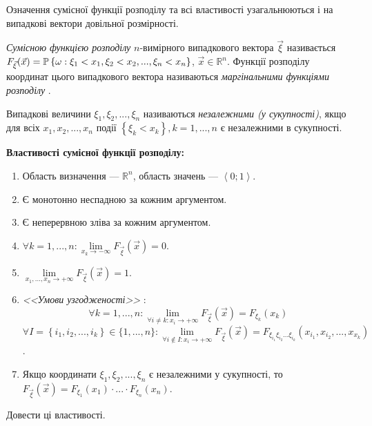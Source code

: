 Означення сумісної функції розподілу та всі властивості узагальнюються і на випадкові вектори довільної розмірності.
\begin{definition} 
    \emph{Сумісною функцією розподілу} $n$-вимірного випадкового вектора $\vec{\xi}$ 
    називається $F_{\vec{\xi}}(\vec{x}) = \P\left\{\omega: \xi_1 < x_1, \xi_2 < x_2, ..., \xi_n < x_n\right\}$, $\vec{x} \in \mathbb{R}^n$.
    Функції розподілу координат цього випадкового вектора називаються \emph{маргінальними функціями розподілу} .
\end{definition}
\begin{definition}
    Випадкові величини $\xi_1, \xi_2, ..., \xi_n$ називаються
    \emph{незалежними (у сукупності)}, якщо для всіх
    $x_1, x_2, ... , x_n$
    події $\left\{\xi_k < x_k\right\}, k=1,...,n$ є незалежними в сукупності.
\end{definition}

\noindent\textbf{Властивості сумісної функції розподілу:}
\begin{enumerate}
    \item Область визначення --- $\mathbb{R}^n$, область значень --- $\left<0; 1\right>$.
    \item Є монотонно неспадною за кожним аргументом.
    \item Є неперервною зліва за кожним аргументом.
    \item $\forall k = 1,...,n: \underset{x_k \to -\infty}{\lim} F_{\vec{\xi}}(\vec{x}) = 0$.
    \item $\lim\limits_{x_1, ..., x_n \rightarrow +\infty} F_{\vec{\xi}}(\vec{x}) = 1$.
    \item \emph{<<Умови узгодженості>>} : 
        $$\forall k = 1,...,n: \lim\limits_{\forall i\neq k : x_i \to + \infty} F_{\vec{\xi}}(\vec{x}) = F_{\xi_k}(x_k)$$
        $$\forall I = \left\{i_1, i_2, ..., i_k\right\} \in \{1,...,n\}: 
        \lim\limits_{\forall i \notin I : x_i \to + \infty} F_{\vec{\xi}}(\vec{x}) =
        F_{\xi_{i_1} \xi_{i_2} ... \xi_{i_k}}(x_{i_1}, x_{i_2}, ..., x_{x_k})$$.
    \item Якщо координати $\xi_1, \xi_2, ..., \xi_n$ є незалежними у сукупності, то 
    $F_{\vec{\xi}}(\vec{x}) = F_{\xi_1}(x_1) \cdot ... \cdot F_{\xi_n}(x_n)$.
\end{enumerate}
\begin{exercise}
    Довести ці властивості.
\end{exercise}

